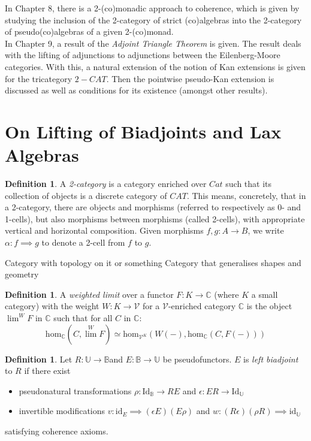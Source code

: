 \documentclass{article}
\numberwithin{equation}{section}
\theoremstyle{definition}
\theoremstyle{definition}
\newtheorem{defn}[thm]{Definition}
\theoremstyle{remark}
\theoremstyle{remark}
\begin{document}
		In Chapter 8, there is a 2-(co)monadic approach to coherence, which is given by studying the inclusion of the 2-category of strict (co)algebras into the 2-category of pseudo(co)algebras of a given 2-(co)monad.\\

		In Chapter 9, a result of the \textit{Adjoint Triangle Theorem} is given. The result deals with the lifting of adjunctions to adjunctions between the Eilenberg-Moore categories. With this, a natural extension of the notion of Kan extensions is given for the tricategory $2-CAT$.
		Then the pointwise pseudo-Kan extension is discussed as well as conditions for its existence (amongst other results).


\section{On Lifting of Biadjoints and Lax Algebras}		


	\begin{defn}
		A \textit{2-category} is a category enriched over $Cat$ such that its collection of objects is a discrete category of $ CAT$. 
		This means, concretely, that in a 2-category, there are objects and morphisms (referred to respectively as 0- and 1-cells), but also morphisms between morphisms (called 2-cells), with appropriate vertical and horizontal composition.
		Given morphisms $ f,g:A \longrightarrow B$, we write $ \alpha: f \implies g$ to denote a 2-cell from $f $ to $g$.

	\end{defn}

	Category with topology on it or something
	Category that generalises shapes and geometry
	 
	\begin{defn}
		A \textit{weighted limit} over a functor $ F:K \longrightarrow \mathbb{C}$ (where $ K$ a small category) with the weight $W: K \longrightarrow \mathcal{V}$ for a $ \mathcal{V}$-enriched category $ \mathbb{C}$ is the object $ \lim ^W F$ in $ \mathbb{C}$ such that for all $C$ in $ \mathbb{C}$:
		\[
			\text{hom} _{ \mathbb{C}}(C, \lim ^W F) \simeq \text{hom} _{ \mathcal{V}^K}(W(-), \text{hom} _{ \mathbb{C}}(C, F(-)))
		\] 
	\end{defn}
	
	\begin{defn}
		Let $R: \mathbb{U} \longrightarrow  \mathbb{B}$and $ E: \mathbb{B} \longrightarrow \mathbb{U}$ be pseudofunctors. $ E$ is \textit{left biadjoint} to $ R$ if there exist
			\begin{itemize}
				\item pseudonatural transformations $ \rho: \text{Id} _{ \mathbb{B}} \longrightarrow RE $ and $ \epsilon: ER \longrightarrow \text{Id} _{ \mathbb{U}}$ \\
				\item invertible modifications $v: \text{id} _{E} \implies ( \epsilon E) (E \rho) $ and $ w: (R \epsilon)( \rho R) \implies \text{id} _{ \mathbb{ U}}$
			\end{itemize}
		satisfying coherence axioms.
	\end{defn}
	
\end{document}
